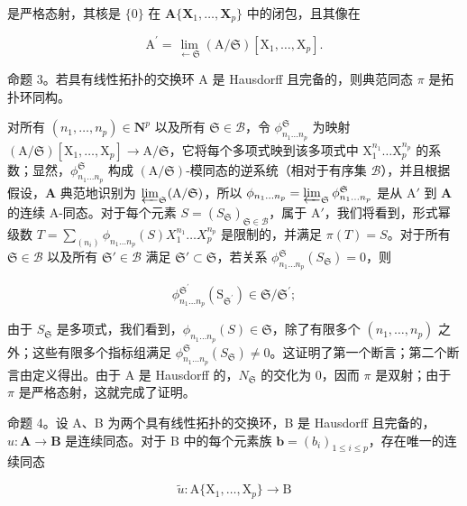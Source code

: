是严格态射，其核是 \(\{0\}\) 在 \(\mathbf{A}\{\mathbf{X}_1,\ldots ,\mathbf{X}_p\}\) 中的闭包，且其像在

\[
\mathrm{A} ^ {\prime} = \lim _ {\leftarrow \mathfrak {S}} (\mathrm{A} / \mathfrak {S}) [ \mathrm{X} _ {1}, \dots , \mathrm{X} _ {p} ].
\]

命题 3。若具有线性拓扑的交换环 A 是 Hausdorff 且完备的，则典范同态 \(\pi\) 是拓扑环同构。

对所有 \((n_1, \ldots, n_p) \in \mathbf{N}^p\) 以及所有 \(\mathfrak{S} \in \mathcal{B}\)，令 \(\phi_{n_1 \ldots n_p}^{\mathfrak{S}}\) 为映射 \((\mathrm{A} / \mathfrak{S})[\mathrm{X}_1, \ldots, \mathrm{X}_p] \to \mathrm{A} / \mathfrak{S}\)，它将每个多项式映到该多项式中 \(\mathrm{X}_1^{n_1} \ldots \mathrm{X}_p^{n_p}\) 的系数；显然，\(\phi_{n_1 \ldots n_p}^{\mathfrak{S}}\) 构成 \((\mathrm{A} / \mathfrak{S})\)-模同态的逆系统（相对于有序集 \(\mathcal{B}\)），并且根据假设，\(\mathbf{A}\) 典范地识别为 \(\varprojlim_{\mathfrak{S}} (\mathrm{A} / \mathfrak{S})\)，所以 \(\phi_{n_1 \ldots n_p} = \varprojlim_{\mathfrak{S}} \phi_{n_1 \ldots n_p}^{\mathfrak{S}}\) 是从 \(\mathrm{A}'\) 到 \(\mathbf{A}\) 的连续 A-同态。对于每个元素 \(S = (S_{\mathfrak{S}})_{\mathfrak{S} \in \mathcal{B}}\)，属于 \(\mathrm{A}'\)，我们将看到，形式幂级数 \(T = \sum_{(n_i)} \phi_{n_1 \ldots n_p}(S) X_1^{n_1} \ldots X_p^{n_p}\) 是限制的，并满足 \(\pi(T) = S\)。对于所有 \(\mathfrak{S} \in \mathcal{B}\) 以及所有 \(\mathfrak{S}' \in \mathcal{B}\) 满足 \(\mathfrak{S}' \subset \mathfrak{S}\)，若关系 \(\phi_{n_1 \ldots n_p}^{\mathfrak{S}}(S_{\mathfrak{S}}) = 0\)，则

\[
\phi_ {n _ {1} \dots n _ {p}} ^ {\mathfrak {S} ^ {\prime}} (\mathrm{S} _ {\mathfrak {S} ^ {\prime}}) \in \mathfrak {S} / \mathfrak {S} ^ {\prime};
\]

由于 \(S_{\mathfrak{S}}\) 是多项式，我们看到，\(\phi_{n_{1}\ldots n_{p}}(S) \in \mathfrak{S}\)，除了有限多个 \((n_{1}, \ldots, n_{p})\) 之外；这些有限多个指标组满足 \(\phi_{n_{1}\ldots n_{p}}^{\mathfrak{S}}(S_{\mathfrak{S}}) \neq 0\)。这证明了第一个断言；第二个断言由定义得出。由于 A 是 Hausdorff 的，\(N_{\mathfrak{S}}\) 的交化为 0，因而 \(\pi\) 是双射；由于 \(\pi\) 是严格态射，这就完成了证明。

命题 4。设 A、B 为两个具有线性拓扑的交换环，B 是 Hausdorff 且完备的，\(u: \mathbf{A} \to \mathbf{B}\) 是连续同态。对于 B 中的每个元素族 \(\mathbf{b} = (b_i)_{1 \leq i \leq p}\)，存在唯一的连续同态

\[
\tilde {u} \colon \mathrm{A} \{\mathrm{X} _ {1}, \dots , \mathrm{X} _ {p} \} \rightarrow \mathrm{B}
\]

